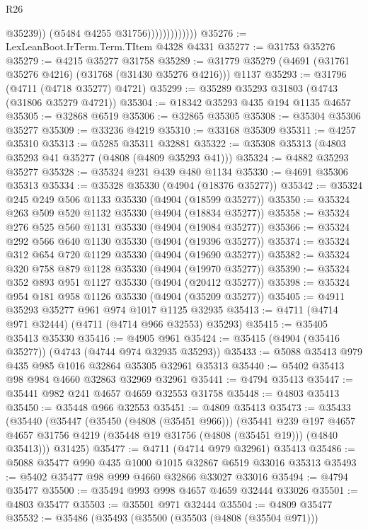 \begin{lexlean}{R26}
\begin{coremodule}
                                @35239))
                            (@5484 @4255 @31756)))))))))))))
@35276 := LexLeanBoot.IrTerm.Term.TItem @4328 @4331
@35277 := @31753 @35276
@35279 := @4215 @35277 @31758
@35289 := @31779 @35279 (@4691 (@31761 @35276 @4216) (@31768 (@31430 @35276 @4216))) @1137
@35293 := @31796 (@4711 (@4718 @35277) @4721)
@35299 := @35289 @35293 @31803 (@4743 (@31806 @35279 @4721))
@35304 := @18342 @35293 @435 @194 @1135 @4657
@35305 := @32868 @6519
@35306 := @32865 @35305
@35308 := @35304 @35306 @35277
@35309 := @33236 @4219
@35310 := @33168 @35309
@35311 := @4257 @35310
@35313 := @5285 @35311 @32881
@35322 := @35308 @35313 (@4803 @35293 @41 @35277 (@4808 (@4809 @35293 @41)))
@35324 := @4882 @35293 @35277
@35328 := @35324 @231 @439 @480 @1134
@35330 := @4691 @35306 @35313
@35334 := @35328 @35330 (@4904 (@18376 @35277))
@35342 := @35324 @245 @249 @506 @1133 @35330 (@4904 (@18599 @35277))
@35350 := @35324 @263 @509 @520 @1132 @35330 (@4904 (@18834 @35277))
@35358 := @35324 @276 @525 @560 @1131 @35330 (@4904 (@19084 @35277))
@35366 := @35324 @292 @566 @640 @1130 @35330 (@4904 (@19396 @35277))
@35374 := @35324 @312 @654 @720 @1129 @35330 (@4904 (@19690 @35277))
@35382 := @35324 @320 @758 @879 @1128 @35330 (@4904 (@19970 @35277))
@35390 := @35324 @352 @893 @951 @1127 @35330 (@4904 (@20412 @35277))
@35398 := @35324 @954 @181 @958 @1126 @35330 (@4904 (@35209 @35277))
@35405 := @4911 @35293 @35277 @961 @974 @1017 @1125 @32935
@35413 := @4711 (@4714 @971 @32444) (@4711 (@4714 @966 @32553) @35293)
@35415 := @35405 @35413 @35330
@35416 := @4905 @961
@35424 := @35415 (@4904 (@35416 @35277)) (@4743 (@4744 @974 @32935 @35293))
@35433 := @5088 @35413 @979 @435 @985 @1016 @32864 @35305 @32961 @35313
@35440 := @5402 @35413 @98 @984 @4660 @32863 @32969 @32961
@35441 := @4794 @35413
@35447 := @35441 @982 @241 @4657 @4659 @32553 @31758
@35448 := @4803 @35413
@35450 := @35448 @966 @32553
@35451 := @4809 @35413
@35473 := @35433
    (@35440
      (@35447
        (@35450 (@4808 (@35451 @966)))
        (@35441
          @239
          @197
          @4657
          @4657
          @31756
          @4219
          (@35448 @19 @31756 (@4808 (@35451 @19)))
          (@4840 @35413)))
      @31425)
@35477 := @4711 (@4714 @979 @32961) @35413
@35486 := @5088 @35477 @990 @435 @1000 @1015 @32867 @6519 @33016 @35313
@35493 := @5402 @35477 @98 @999 @4660 @32866 @33027 @33016
@35494 := @4794 @35477
@35500 := @35494 @993 @998 @4657 @4659 @32444 @33026
@35501 := @4803 @35477
@35503 := @35501 @971 @32444
@35504 := @4809 @35477
@35532 := @35486
    (@35493
      (@35500
        (@35503 (@4808 (@35504 @971)))

\end{coremodule}
\end{lexlean}
